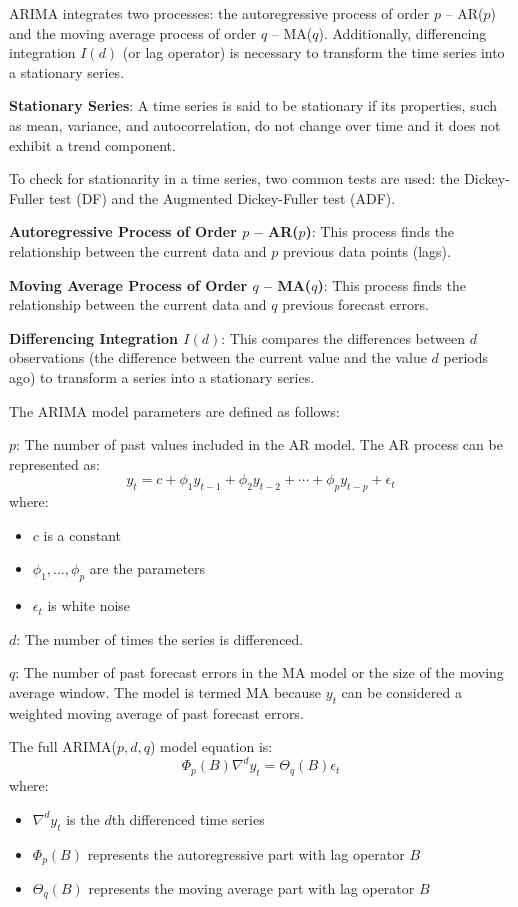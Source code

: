 \documentclass{ieeeojies}
\begin{document}
ARIMA integrates two processes: the autoregressive process of order $p$ – AR($p$) and the moving average process of order $q$ – MA($q$). Additionally, differencing integration $I(d)$ (or lag operator) is necessary to transform the time series into a stationary series.

\textbf{Stationary Series}: A time series is said to be stationary if its properties, such as mean, variance, and autocorrelation, do not change over time and it does not exhibit a trend component.

To check for stationarity in a time series, two common tests are used: the Dickey-Fuller test (DF) and the Augmented Dickey-Fuller test (ADF).

\textbf{Autoregressive Process of Order $p$ – AR($p$)}: This process finds the relationship between the current data and $p$ previous data points (lags).

\textbf{Moving Average Process of Order $q$ – MA($q$)}: This process finds the relationship between the current data and $q$ previous forecast errors.

\textbf{Differencing Integration $I(d)$}: This compares the differences between $d$ observations (the difference between the current value and the value $d$ periods ago) to transform a series into a stationary series.

The ARIMA model parameters are defined as follows:

$p$: The number of past values included in the AR model. The AR process can be represented as:
\[
y_t = c + \phi_1 y_{t-1} + \phi_2 y_{t-2} + \cdots + \phi_p y_{t-p} + \epsilon_t
\]
where:
\begin{itemize}
    \item $c$ is a constant
    \item $\phi_1, \ldots, \phi_p$ are the parameters
    \item $\epsilon_t$ is white noise
\end{itemize}

$d$: The number of times the series is differenced.

$q$: The number of past forecast errors in the MA model or the size of the moving average window. The model is termed MA because $y_t$ can be considered a weighted moving average of past forecast errors.

The full ARIMA($p, d, q$) model equation is:
\[
\Phi_p (B) \nabla^d y_t = \Theta_q (B) \epsilon_t
\]
where:
\begin{itemize}
    \item $\nabla^d y_t$ is the $d$th differenced time series
    \item $\Phi_p (B)$ represents the autoregressive part with lag operator $B$
    \item $\Theta_q (B)$ represents the moving average part with lag operator $B$
\end{itemize}
\end{document}
